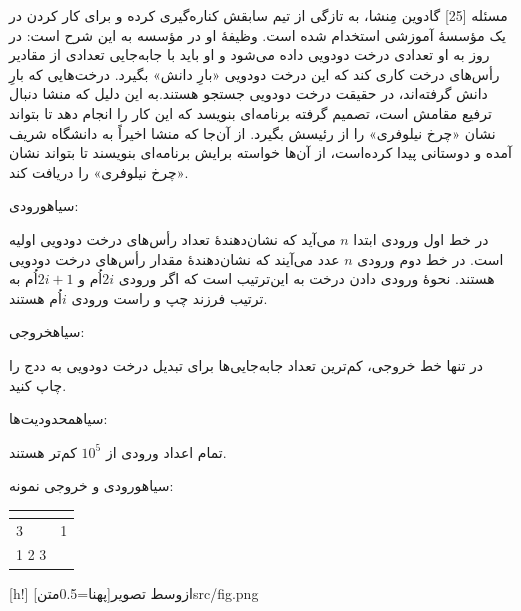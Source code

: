 ‌مسئله [25]
گادوین مِنشا،  به تازگی از تیم سابقش کناره‌گیری کرده و برای کار کردن در یک مؤسسۀ آموزشی استخدام شده است. وظیفۀ او در مؤسسه به این شرح است: در روز به او تعدادی درخت دودویی داده می‌شود و او باید با  جابه‌جایی‌ تعدادی از مقادیر رأس‌های درخت کاری کند که این درخت دودویی «بارِ دانش» بگیرد. درخت‌هایی که ‌بارِ دانش گرفته‌اند، در حقیقت درخت دودویی جستجو هستند.به این دلیل که منشا دنبال  ترفیع مقامش است، تصمیم گرفته برنامه‌ای بنویسد که  این کار را انجام دهد تا بتواند نشان «چرخ نیلوفری» را از رئیسش  بگیرد. از آن‌جا که منشا اخیراً به دانشگاه شریف آمده و دوستانی پیدا کرده‌است، از آن‌ها خواسته برایش برنامه‌ای بنویسند تا بتواند نشان «چرخ نیلوفری»  را دریافت کند.

‌سیاه{ورودی:}

در خط اول ورودی ابتدا $n$ می‌آید که نشان‌دهندۀ تعداد رأس‌های درخت دودویی اولیه است.
در خط دوم ورودی $n$ عدد می‌آیند که نشان‌دهندۀ مقدار  رأس‌های درخت دودویی هستند.
نحوۀ ورودی دادن درخت به این‌ترتیب است که اگر ورودی $2i$اُم و $2i+1$اُم به ترتیب فرزند چپ و راست ورودی $i$اُم هستند.

‌سیاه{خروجی:}

در تنها خط خروجی، کم‌ترین تعداد جابه‌جایی‌ها برای تبدیل درخت دودویی به ددج را چاپ کنید.

‌سیاه{محدودیت‌ها:}

تمام اعداد ورودی از $10^5$ کم‌تر هستند.

‌سیاه{ورودی و خروجی نمونه:}

\begin{latin}
	\begin{tabularx}{\textwidth}{|X | X|}
		\hline
		\textbf{\rl{ورودی }} &
		{\centering\textbf{\rl{خروجی }}}\\
		\hline
		3&
		1\\
		1 2 3&\\
		\hline
		
	\end{tabularx}
\end{latin}

[h!]
‌ازوسط
  ‌تصویر[پهنا=0.5‌متن]{src/fig.png}



